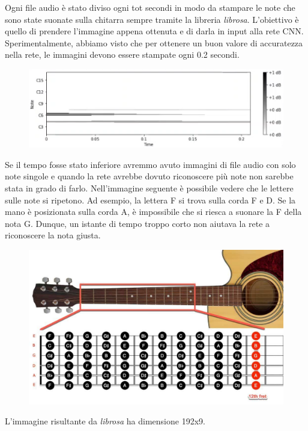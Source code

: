 Ogni file audio è stato diviso ogni tot secondi in modo da stampare le note che sono state suonate sulla chitarra sempre tramite la libreria \textit{librosa}. L'obiettivo è quello di prendere l'immagine appena ottenuta e di darla in input alla rete CNN. Sperimentalmente, abbiamo visto che per ottenere un buon valore di accuratezza nella rete, le immagini devono essere stampate ogni 0.2 secondi.

\begin{figure}[H]
	\centering
	\includegraphics[scale=0.90]{./images/img7.png}
\end{figure}
Se il tempo fosse stato inferiore avremmo avuto immagini di file audio con solo note singole e quando la rete avrebbe dovuto riconoscere più note non sarebbe stata in grado di farlo. Nell'immagine seguente è possibile vedere che le lettere sulle note si ripetono. Ad esempio, la lettera F si trova sulla corda F e D. Se la mano è posizionata sulla corda A, è impossibile che si riesca a suonare la F della nota G. Dunque, un istante di tempo troppo corto non aiutava la rete a riconoscere la nota giusta.

\begin{figure}[H]
	\centering
	\includegraphics[scale=0.20]{./images/img12.jpg}
\end{figure}

L'immagine risultante da \textit{librosa} ha dimensione 192x9.\\

